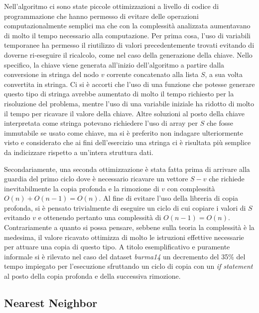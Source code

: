 Nell'algoritmo ci sono state piccole ottimizzazioni a livello di codice di programmazione che hanno permesso di evitare delle operazioni computazionalmente semplici ma che con la complessità analizzata aumentavano di molto il tempo necessario alla computazione. Per prima cosa, l'uso di variabili temporanee ha permesso il riutilizzo di valori precedentemente trovati evitando di doverne ri-eseguire il ricalcolo, come nel caso della generazione della chiave. Nello specifico, la chiave viene generata all'inizio dell'algoritmo a partire dalla conversione in stringa del nodo \(v\) corrente concatenato alla lista \(S\), a sua volta convertita in stringa.
Ci si è accorti che l'uso di una funzione che potesse generare questo tipo di stringa avrebbe aumentato di molto il tempo richiesto per la risoluzione del problema, mentre l'uso di una variabile iniziale ha ridotto di molto il tempo per ricavare il valore della chiave.
Altre soluzioni al posto della chiave interpretata come stringa potevano richiedere l'uso di array per \(S\) che fosse immutabile se usato come chiave, ma si è preferito non indagare ulteriormente visto e considerato che ai fini dell'esercizio una stringa ci è risultata più semplice da indicizzare rispetto a un'intera struttura dati. 

Secondariamente, una seconda ottimizzazione è stata fatta prima di arrivare alla guardia del primo ciclo dove è necessario ricavare un vettore \(S - {v}\) che richiede inevitabilmente la copia profonda e la rimozione di \(v\) con complessità \(O(n) + O(n-1) = O(n)\). Al fine di evitare l'uso della libreria di copia profonda, si è pensato trivialmente di eseguire un ciclo di cui copiare i valori di \(S\) evitando \(v\) e ottenendo pertanto una complessità di \(O(n-1) = O(n)\). 
Contrariamente a quanto si possa pensare, sebbene sulla teoria la complessità è la medesima, il valore ricavato ottimizza di molto le istruzioni effettive necessarie per attuare una copia di questo tipo. A titolo esemplificativo e puramente informale si è rilevato nel caso del dataset \textit{burma14} un decremento del 35\% del tempo impiegato per l'esecuzione sfruttando un ciclo di copia con un \textit{if statement} al posto della copia profonda e della successiva rimozione. 


\subsection{Nearest Neighbor}

